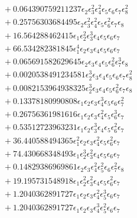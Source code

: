 \documentclass[10pt]{article}
\begin{document}
\begin{align*}
&{}  + 0.064390759211237 \epsilon_{2} \epsilon_{3}^{2} \epsilon_{4}^{2} \epsilon_{5} \epsilon_{6} \epsilon_{7} \epsilon_{8}^{2} \\
&{}  + 0.25756303684495 \epsilon_{2} \epsilon_{3}^{2} \epsilon_{4}^{2} \epsilon_{5} \epsilon_{6}^{2} \epsilon_{7} \epsilon_{8} \\
&{}  + 16.564288462415 \epsilon_{1} \epsilon_{2}^{2} \epsilon_{3}^{3} \epsilon_{4} \epsilon_{5} \epsilon_{6} \epsilon_{7} \\
&{}  + 66.534282381845 \epsilon_{1}^{4} \epsilon_{2} \epsilon_{3} \epsilon_{4} \epsilon_{5} \epsilon_{6} \epsilon_{7} \\
&{}  + 0.065691582629645 \epsilon_{2} \epsilon_{3} \epsilon_{4} \epsilon_{5} \epsilon_{6}^{2} \epsilon_{7}^{3} \epsilon_{8} \\
&{}  + 0.0020538491234581 \epsilon_{2}^{3} \epsilon_{3} \epsilon_{4} \epsilon_{5} \epsilon_{6} \epsilon_{7} \epsilon_{8}^{2} \\
&{}  + 0.0082153964938325 \epsilon_{2}^{3} \epsilon_{3} \epsilon_{4} \epsilon_{5} \epsilon_{6}^{2} \epsilon_{7} \epsilon_{8} \\
&{}  + 0.13378180990808 \epsilon_{1} \epsilon_{2} \epsilon_{3} \epsilon_{4}^{3} \epsilon_{5} \epsilon_{6} \epsilon_{7}^{2} \\
&{}  + 0.26756361981616 \epsilon_{1} \epsilon_{2} \epsilon_{3} \epsilon_{4}^{2} \epsilon_{5} \epsilon_{6}^{3} \epsilon_{7} \\
&{}  + 0.53512723963231 \epsilon_{1} \epsilon_{2} \epsilon_{3}^{3} \epsilon_{4} \epsilon_{5} \epsilon_{6}^{2} \epsilon_{7} \\
&{}  + 36.440588494365 \epsilon_{1}^{2} \epsilon_{2} \epsilon_{3} \epsilon_{4}^{2} \epsilon_{5} \epsilon_{6}^{2} \epsilon_{7} \\
&{}  + 74.430668348493 \epsilon_{1} \epsilon_{2}^{3} \epsilon_{3}^{2} \epsilon_{4} \epsilon_{5} \epsilon_{6} \epsilon_{7} \\
&{}  + 0.14829386969861 \epsilon_{2} \epsilon_{3} \epsilon_{4}^{2} \epsilon_{5}^{2} \epsilon_{6} \epsilon_{7}^{2} \epsilon_{8} \\
&{}  + 19.195731548918 \epsilon_{1} \epsilon_{2}^{2} \epsilon_{3}^{2} \epsilon_{4} \epsilon_{5} \epsilon_{6}^{2} \epsilon_{7} \\
&{}  + 1.2040362891727 \epsilon_{1} \epsilon_{2} \epsilon_{3} \epsilon_{4}^{2} \epsilon_{5}^{3} \epsilon_{6} \epsilon_{7} \\
&{}  + 1.2040362891727 \epsilon_{1} \epsilon_{2} \epsilon_{3} \epsilon_{4}^{3} \epsilon_{5}^{2} \epsilon_{6} \epsilon_{7} \\

\end{align*}
\end{document}
